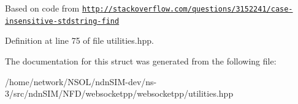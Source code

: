 Based on code from \href{http://stackoverflow.com/questions/3152241/case-insensitive-stdstring-find}{\tt http\+://stackoverflow.\+com/questions/3152241/case-\/insensitive-\/stdstring-\/find} 

Definition at line 75 of file utilities.\+hpp.



The documentation for this struct was generated from the following file\+:\begin{DoxyCompactItemize}
\item 
/home/network/\+N\+S\+O\+L/ndn\+S\+I\+M-\/dev/ns-\/3/src/ndn\+S\+I\+M/\+N\+F\+D/websocketpp/websocketpp/utilities.\+hpp\end{DoxyCompactItemize}
